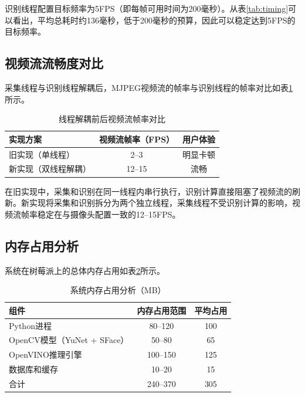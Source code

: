 识别线程配置目标频率为5FPS（即每帧可用时间为200毫秒）。从表\ref{tab:timing}可以看出，平均总耗时约136毫秒，低于200毫秒的预算，因此可以稳定达到5FPS的目标频率。

\subsection{视频流流畅度对比}

采集线程与识别线程解耦后，MJPEG视频流的帧率与识别线程的帧率对比如表\ref{tab:fps}所示。

\begin{table}[htbp]
    \centering
    \caption{线程解耦前后视频流帧率对比}
    \label{tab:fps}
    \begin{tabular}{lcc}
        \toprule
        \textbf{实现方案} & \textbf{视频流帧率（FPS）} & \textbf{用户体验} \\
        \midrule
        旧实现（单线程） & 2--3 & 明显卡顿 \\
        新实现（双线程解耦） & 12--15 & 流畅 \\
        \bottomrule
    \end{tabular}
\end{table}

在旧实现中，采集和识别在同一线程内串行执行，识别计算直接阻塞了视频流的刷新。新实现将采集和识别拆分为两个独立线程，采集线程不受识别计算的影响，视频流帧率稳定在与摄像头配置一致的12--15FPS。

\subsection{内存占用分析}

系统在树莓派上的总体内存占用如表\ref{tab:memory}所示。

\begin{table}[htbp]
    \centering
    \caption{系统内存占用分析（MB）}
    \label{tab:memory}
    \begin{tabular}{lcc}
        \toprule
        \textbf{组件} & \textbf{内存占用范围} & \textbf{平均占用} \\
        \midrule
        Python进程 & 80--120 & 100 \\
        OpenCV模型（YuNet + SFace） & 50--80 & 65 \\
        OpenVINO推理引擎 & 100--150 & 125 \\
        数据库和缓存 & 10--20 & 15 \\
        \midrule
        合计 & 240--370 & 305 \\
        \bottomrule
    \end{tabular}
\end{table}

